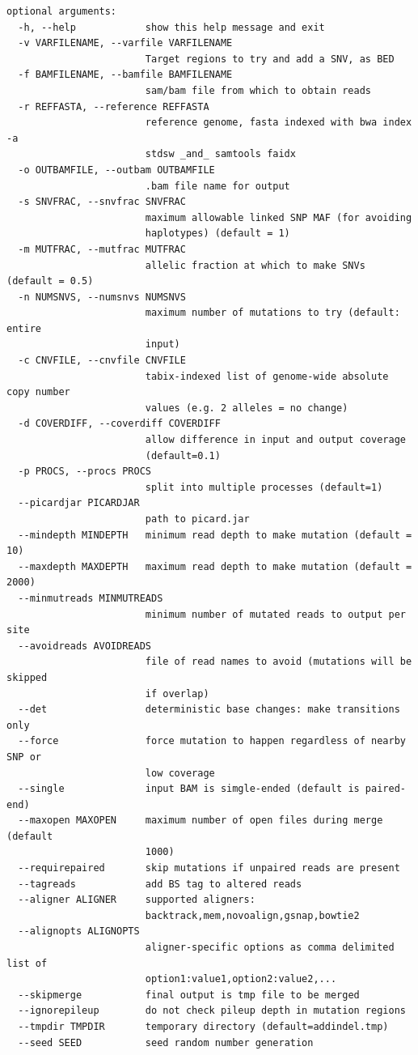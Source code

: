 \documentclass[letterpaper,11pt]{article}
\begin{document}
\begin{verbatim}
optional arguments:
  -h, --help            show this help message and exit
  -v VARFILENAME, --varfile VARFILENAME
                        Target regions to try and add a SNV, as BED
  -f BAMFILENAME, --bamfile BAMFILENAME
                        sam/bam file from which to obtain reads
  -r REFFASTA, --reference REFFASTA
                        reference genome, fasta indexed with bwa index -a
                        stdsw _and_ samtools faidx
  -o OUTBAMFILE, --outbam OUTBAMFILE
                        .bam file name for output
  -s SNVFRAC, --snvfrac SNVFRAC
                        maximum allowable linked SNP MAF (for avoiding
                        haplotypes) (default = 1)
  -m MUTFRAC, --mutfrac MUTFRAC
                        allelic fraction at which to make SNVs (default = 0.5)
  -n NUMSNVS, --numsnvs NUMSNVS
                        maximum number of mutations to try (default: entire
                        input)
  -c CNVFILE, --cnvfile CNVFILE
                        tabix-indexed list of genome-wide absolute copy number
                        values (e.g. 2 alleles = no change)
  -d COVERDIFF, --coverdiff COVERDIFF
                        allow difference in input and output coverage
                        (default=0.1)
  -p PROCS, --procs PROCS
                        split into multiple processes (default=1)
  --picardjar PICARDJAR
                        path to picard.jar
  --mindepth MINDEPTH   minimum read depth to make mutation (default = 10)
  --maxdepth MAXDEPTH   maximum read depth to make mutation (default = 2000)
  --minmutreads MINMUTREADS
                        minimum number of mutated reads to output per site
  --avoidreads AVOIDREADS
                        file of read names to avoid (mutations will be skipped
                        if overlap)
  --det                 deterministic base changes: make transitions only
  --force               force mutation to happen regardless of nearby SNP or
                        low coverage
  --single              input BAM is simgle-ended (default is paired-end)
  --maxopen MAXOPEN     maximum number of open files during merge (default
                        1000)
  --requirepaired       skip mutations if unpaired reads are present
  --tagreads            add BS tag to altered reads
  --aligner ALIGNER     supported aligners:
                        backtrack,mem,novoalign,gsnap,bowtie2
  --alignopts ALIGNOPTS
                        aligner-specific options as comma delimited list of
                        option1:value1,option2:value2,...
  --skipmerge           final output is tmp file to be merged
  --ignorepileup        do not check pileup depth in mutation regions
  --tmpdir TMPDIR       temporary directory (default=addindel.tmp)
  --seed SEED           seed random number generation
  
\end{verbatim}
\end{document}
